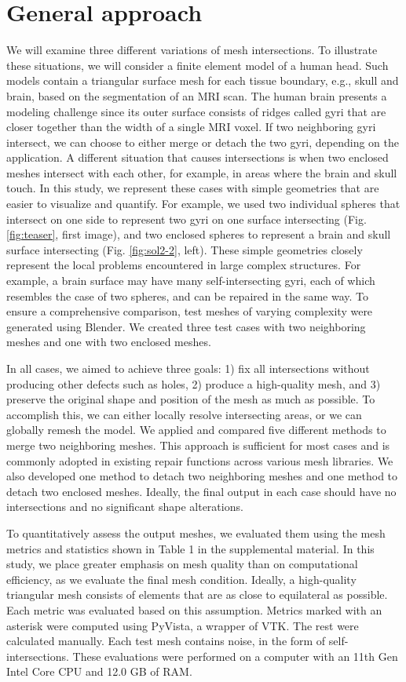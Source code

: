 \section{General approach}

We will examine three different variations of mesh intersections. To illustrate these situations, we will consider a finite element model of a human head. Such models contain a triangular surface mesh for each tissue boundary, e.g., skull and brain, based on the segmentation of an MRI scan. The human brain presents a modeling challenge since its outer surface consists of ridges called gyri that are closer together than the width of a single MRI voxel. If two neighboring gyri intersect, we can choose to either merge or detach the two gyri, depending on the application. A different situation that causes intersections is when two enclosed meshes intersect with each other, for example, in areas where the brain and skull touch. In this study, we represent these cases with simple geometries that are easier to visualize and quantify. For example, we used two individual spheres that intersect on one side to represent two gyri on one surface intersecting (Fig. \ref{fig:teaser}, first image), and two enclosed spheres to represent a brain and skull surface intersecting (Fig. \ref{fig:sol2-2}, left). These simple geometries closely represent the local problems encountered in large complex structures. For example, a brain surface may have many self-intersecting gyri, each of which resembles the case of two spheres, and can be repaired in the same way. To ensure a comprehensive comparison, test meshes of varying complexity were generated using Blender. We created three test cases with two neighboring meshes and one with two enclosed meshes.

In all cases, we aimed to achieve three goals: 1) fix all intersections without producing other defects such as holes, 2) produce a high-quality mesh, and 3) preserve the original shape and position of the mesh as much as possible. To accomplish this, we can either locally resolve intersecting areas, or we can globally remesh the model. We applied and compared five different methods to merge two neighboring meshes. This approach is sufficient for most cases and is commonly adopted in existing repair functions across various mesh libraries. We also developed one method to detach two neighboring meshes and one method to detach two enclosed meshes. Ideally, the final output in each case should have no intersections and no significant shape alterations. 

To quantitatively assess the output meshes, we  evaluated them using the mesh metrics and statistics shown in Table 1 in the supplemental material. In this study, we place greater emphasis on mesh quality than on computational efficiency, as we evaluate the final mesh condition. Ideally, a high-quality triangular mesh consists of elements that are as close to equilateral as possible. Each metric was evaluated based on this assumption. Metrics marked with an asterisk were computed using PyVista, a wrapper of VTK. The rest were calculated manually. Each test mesh contains noise, in the form of self-intersections. These evaluations were performed on a computer with an 11th Gen Intel Core CPU and 12.0 GB of RAM. 

